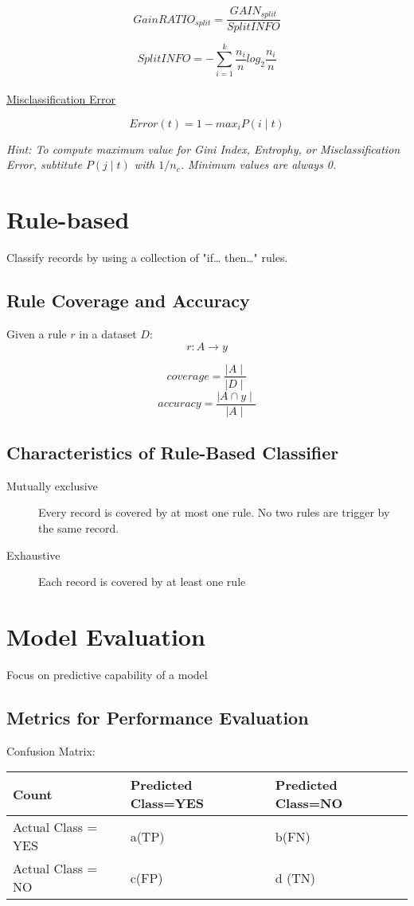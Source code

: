$$GainRATIO_{split}=\frac{GAIN_{split}}{SplitINFO}$$

$$SplitINFO=-\sum_{i=1}^{k} \frac{n_i}{n}log_2 \frac{n_i}{n}$$ \\
\underline{Misclassification Error}

$$Error(t)=1-max_i P(i \mid t)$$ 
\par \noindent
{\it Hint: To compute maximum value for Gini Index, Entrophy, or Misclassification Error, subtitute $P(j\mid t)$ with $1/ n_c$. Minimum values are always 0. }

\section{Rule-based}
Classify records by using a collection of "if… then…" rules. \\

\subsection{Rule Coverage and Accuracy}
Given a rule $r$ in a dataset $D$:
$$r: A \rightarrow y$$

$$coverage=\frac{\mid A \mid}{\mid D \mid}$$
$$accuracy=\frac{\mid A \cap y \mid}{\mid A \mid}$$

\subsection{Characteristics of Rule-Based Classifier}

\begin{description}
  \item[Mutually exclusive] Every record is covered by at most one rule. No two rules are trigger by the same record.
  \item[Exhaustive] Each record is covered by at least one rule
\end{description}

\section{Model Evaluation}

Focus on predictive capability of a model

\subsection{Metrics for Performance Evaluation}

Confusion Matrix:
\begin{center}
\begin{tabular}{ | p{4cm} | p{4cm} | p{4cm} | } 
    \hline
    Count & Predicted Class=YES & Predicted Class=NO \\
    \hline
    Actual Class = YES & a(TP) & b(FN) \\
    \hline
    Actual Class = NO & c(FP) & d (TN) \\
    \hline
\end{tabular}
\end{center}

